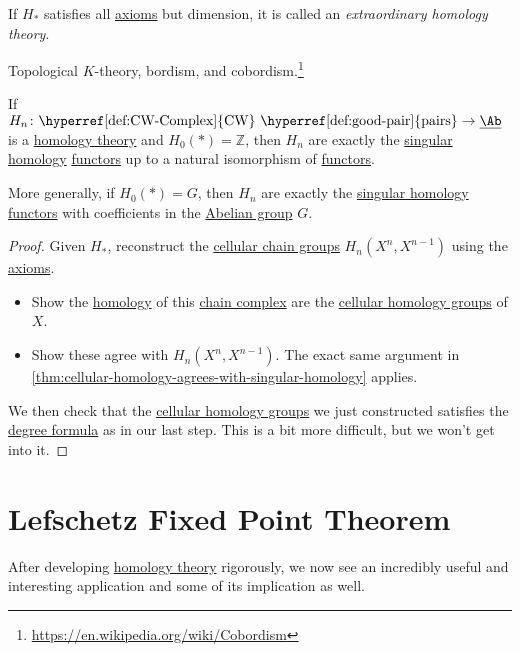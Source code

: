 \begin{definition}\label{def:extraordinary-homology-theory}
	If \(H_\ast\) satisfies all \hyperref[def:homology-theory]{axioms} but dimension, it is called an \emph{extraordinary homology theory}.
\end{definition}

\begin{eg}
	Topological \(K\)-theory, bordism, and cobordism.\footnote{\url{https://en.wikipedia.org/wiki/Cobordism}}
\end{eg}

\begin{theorem}\label{thm:characterization-of-singular-homology}
	If \(H_n \colon \text{\hyperref[def:CW-Complex]{CW} \hyperref[def:good-pair]{pairs}} \to \underline{\Ab}\) is a
	\hyperref[def:homology-theory]{homology theory} and \(H_0(\ast) = \mathbb{Z}\), then \(H_n\) are exactly the \hyperref[def:singular-homology-group]{singular homology} \hyperref[def:functor]{functors} up to a natural isomorphism of \hyperref[def:functor]{functors}.

	More generally, if \(H_0(\ast) = G\), then \(H_n\) are exactly the
	\hyperref[def:singular-homology-group]{singular homology} \hyperref[def:functor]{functors} with coefficients in the \hyperref[def:Abelian-group]{Abelian group} \(G\).
\end{theorem}
\begin{proof}
	Given \(H_\ast\), reconstruct the \hyperref[def:cellular-chain-complex]{cellular chain groups} \(H_n(X^n, X^{n-1})\) using the \hyperref[def:homology-theory]{axioms}.
	\begin{itemize}
		\item Show the \hyperref[def:homology-theory]{homology} of this \hyperref[def:chain-complex]{chain complex} are the \hyperref[def:cellular-homology-group]{cellular homology groups} of \(X\).
		\item Show these agree with \(H_{n} (X^n, X^{n-1})\). The exact same argument in \autoref{thm:cellular-homology-agrees-with-singular-homology} applies.
	\end{itemize}

	We then check that the \hyperref[def:cellular-homology-group]{cellular homology groups} we just constructed satisfies the \hyperref[thm:calculation-with-local-degree]{degree formula} as in our last step. This is a bit more difficult, but we won't get into it.
\end{proof}

\chapter{Lefschetz Fixed Point Theorem}
After developing \hyperref[def:homology-theory]{homology theory} rigorously, we now see an incredibly useful and interesting application and some of its implication as well.

